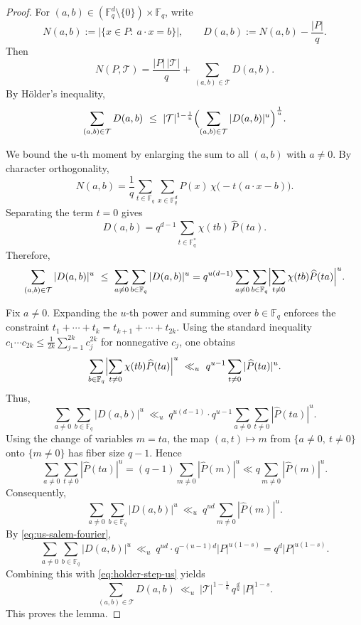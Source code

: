\documentclass{article}
\begin{document}
\begin{proof}
For $(a,b)\in (\mathbb{F}_q^d\setminus\{0\})\times \mathbb{F}_q$, write
\[
N(a,b):=\bigl|\{x\in P:\ a\cdot x=b\}\bigr|,
\qquad
D(a,b):=N(a,b)-\frac{|P|}{q}.
\]
Then
\[
N(P,\mathcal{T})
=\frac{|P|\,|\mathcal{T}|}{q}
+
\sum_{(a,b)\in \mathcal{T}} D(a,b).
\]
By H\"older's inequality,
\begin{equation}\label{eq:holder-step-us}
\sum_{(a,b)\in \mathcal{T}} D(a,b)
\ \le\
|\mathcal{T}|^{1-\frac1u}\Bigl(\sum_{(a,b)\in \mathcal{T}} |D(a,b)|^{u}\Bigr)^{\frac{1}{u}}.
\end{equation}

We bound the $u$-th moment by enlarging the sum to all $(a,b)$ with $a\ne 0$.
By character orthogonality,
\[
N(a,b)
=
\frac{1}{q}\sum_{t\in\mathbb{F}_q}\sum_{x\in\mathbb{F}_q^d}
P(x)\,\chi\!\bigl(-t(a\cdot x-b)\bigr).
\]
Separating the term $t=0$ gives
\begin{equation}\label{eq:Dab-formula-us}
D(a,b)=q^{d-1}\sum_{t\in\mathbb{F}_q^\ast}\chi(tb)\,\widehat{P}(ta).
\end{equation}
Therefore,
\[
\sum_{(a,b)\in \mathcal{T}}|D(a,b)|^{u}
\ \le\
\sum_{a\ne 0}\sum_{b\in\mathbb{F}_q}|D(a,b)|^{u}
=
q^{u(d-1)}\sum_{a\ne 0}\sum_{b\in\mathbb{F}_q}
\Bigl|\sum_{t\ne 0}\chi(tb)\widehat{P}(ta)\Bigr|^{u}.
\]

Fix $a\ne 0$.
Expanding the $u$-th power and summing over $b\in\mathbb{F}_q$ enforces the constraint
$t_1+\cdots+t_k=t_{k+1}+\cdots+t_{2k}$.
Using the standard inequality
$c_1\cdots c_{2k}\le \frac{1}{2k}\sum\limits_{j=1}^{2k} c_j^{2k}$ for nonnegative $c_j$,
one obtains
\[
\sum_{b\in\mathbb{F}_q}\Bigl|\sum_{t\ne 0}\chi(tb)\widehat{P}(ta)\Bigr|^{u}
\ \ll_u\
q^{u-1}\sum_{t\ne 0} |\widehat{P}(ta)|^{u}.
\]
Thus,
\[
\sum_{a\ne 0}\sum_{b\in\mathbb{F}_q}|D(a,b)|^{u}
\ \ll_u\
q^{u(d-1)}\cdot q^{u-1}\sum_{a\ne 0}\sum_{t\ne 0} |\widehat{P}(ta)|^{u}.
\]
Using the change of variables $m=ta$, the map $(a,t)\mapsto m$ from $\{a\ne 0,\ t\ne 0\}$ onto
$\{m\ne 0\}$ has fiber size $q-1$. Hence
\[
\sum_{a\ne 0}\sum_{t\ne 0} |\widehat{P}(ta)|^{u}
=
(q-1)\sum_{m\ne 0}|\widehat{P}(m)|^{u}
\ll
q\sum_{m\ne 0}|\widehat{P}(m)|^{u}.
\]
Consequently,
\[
\sum_{a\ne 0}\sum_{b\in\mathbb{F}_q}|D(a,b)|^{u}
\ \ll_u\
q^{ud}\sum_{m\ne 0}|\widehat{P}(m)|^{u}.
\]
By \eqref{eq:us-salem-fourier},
\[
\sum_{a\ne 0}\sum_{b\in\mathbb{F}_q}|D(a,b)|^{u}
\ \ll_u\
q^{ud}\cdot q^{-(u-1)d}|P|^{u(1-s)}
=
q^{d}|P|^{u(1-s)}.
\]
Combining this with \eqref{eq:holder-step-us} yields
\[
\sum_{(a,b)\in \mathcal{T}} D(a,b)
\ \ll_u\
|\mathcal{T}|^{1-\frac1u}\,q^{\frac{d}{u}}\,|P|^{1-s}.
\]
This proves the lemma.
\end{proof}
\end{document}

